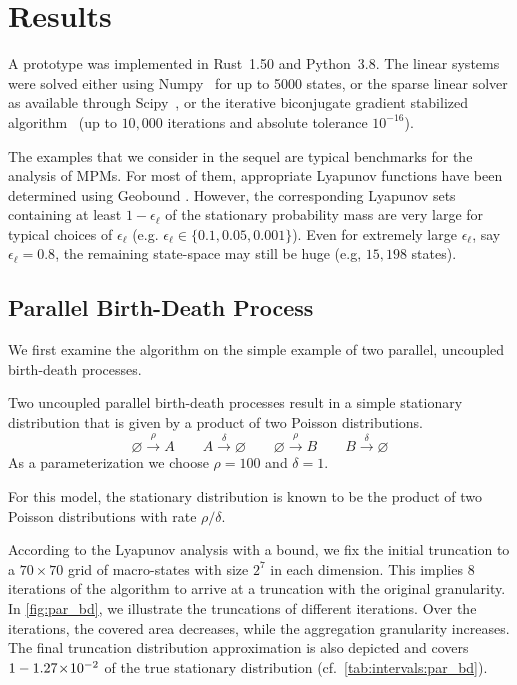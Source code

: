 \section{Results}\label{sec:statagg:results}
A prototype was implemented in Rust~1.50 and Python~3.8.
The linear systems were solved either using Numpy~\cite{numpy} for up to 5000 states, or the sparse linear solver as available through Scipy~\cite{2020SciPy-NMeth}, or the iterative biconjugate gradient stabilized algorithm~\cite{van1992bi} (up to $10,000$ iterations and absolute tolerance $10^{-16}$).

The examples that we consider in the sequel 
are typical benchmarks for the analysis of \acp{MPM}. For most of them, appropriate Lyapunov functions
have been determined using Geobound \cite{geobound,spieler2014numerical}.
However, the corresponding Lyapunov sets containing at least $1-\epsilon_{\ell}$ of the stationary probability mass are very large for typical choices of $\epsilon_{\ell}$ (e.g. $\epsilon_{\ell}\in \{0.1,0.05,0.001\}$). Even
for extremely large $\epsilon_{\ell}$, say $\epsilon_{\ell}=0.8$, the remaining state-space may still be huge (e.g, $15,198$ states).
\subsection{Parallel Birth-Death Process}
We first examine the algorithm on the simple example of two parallel, uncoupled birth-death processes.
\begin{model}\label{model:par_bd}
Two uncoupled parallel birth-death processes result in a simple stationary distribution that is
given by a product of two Poisson distributions.
$$\varnothing\xrightarrow{\rho} A \qquad A\xrightarrow{\delta} \varnothing \qquad
\varnothing\xrightarrow{\rho} B \qquad B\xrightarrow{\delta} \varnothing$$
As a parameterization we choose $\rho = 100$ and $\delta=1$.
\end{model}
For this model, the stationary distribution is known to be the product of two Poisson distributions with rate $\rho / \delta$.

According to the Lyapunov analysis with a  bound, we fix the initial truncation to a $70\times 70$ grid of macro-states with size $2^7$ in each dimension.
This implies 8 iterations of the algorithm to arrive at a truncation with the original granularity.
In \autoref{fig:par_bd}, we illustrate the truncations of different iterations.
Over the iterations, the covered area decreases, while the aggregation granularity increases.
The final truncation distribution approximation is also depicted and covers $1 -  1.27\!\times\!10^{-2} $ of the true stationary distribution (cf.\ \autoref{tab:intervals:par_bd}).

